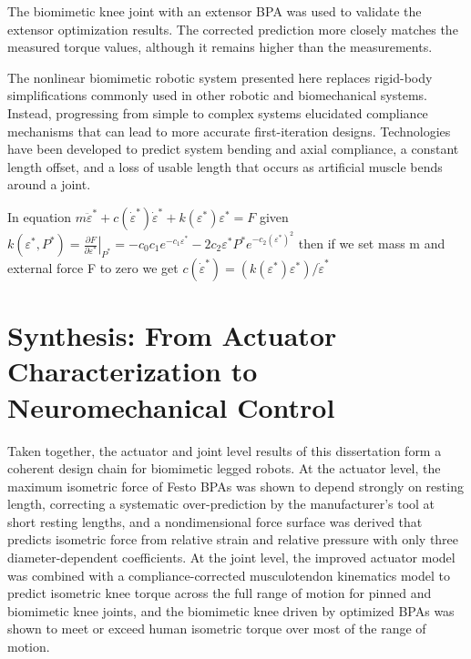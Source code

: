 The biomimetic knee joint with an extensor BPA was used to validate the extensor optimization results. The corrected prediction more closely matches the measured torque values, although it remains higher than the measurements.


The nonlinear biomimetic robotic system presented here replaces rigid-body simplifications commonly used in other robotic and biomechanical systems. Instead, progressing from simple to complex systems elucidated compliance mechanisms that can lead to more accurate first-iteration designs. Technologies have been developed to predict system bending and axial compliance, a constant length offset, and a loss of usable length that occurs as artificial muscle bends around a joint. 

In equation $m\ddot \varepsilon^* + c (\dot \varepsilon^* ) \dot \varepsilon^* + k ( \varepsilon^* ) \varepsilon^* = F$ given $k(\varepsilon^{*}, P^{*})
= \left.\frac{\partial F}{\partial \varepsilon^{*}}\right|_{P^{*}}
= -c_{0}c_{1}e^{-c_{1}\varepsilon^{*}}
  - 2c_{2}\varepsilon^{*}P^{*}e^{-c_{2}(\varepsilon^{*})^{2}}$
then if we set mass m and external force F to zero we get
$c (\dot \varepsilon^* ) = (k ( \varepsilon^* ) \varepsilon^*)/\dot \varepsilon^*$


\section{Synthesis: From Actuator Characterization to Neuromechanical Control}\label{sec:synthesis}

Taken together, the actuator and joint level results of this dissertation form a coherent design chain for biomimetic legged robots. At the actuator level, the maximum isometric force of Festo BPAs was shown to depend strongly on resting length, correcting a systematic over-prediction by the manufacturer's tool at short resting lengths, and a nondimensional force surface was derived that predicts isometric force from relative strain and relative pressure with only three diameter-dependent coefficients. At the joint level, the improved actuator model was combined with a compliance-corrected musculotendon kinematics model to predict isometric knee torque across the full range of motion for pinned and biomimetic knee joints, and the biomimetic knee driven by optimized BPAs was shown to meet or exceed human isometric torque over most of the range of motion.

